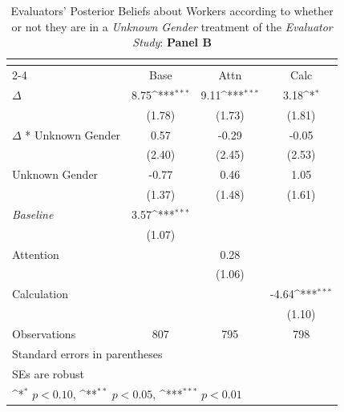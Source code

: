 \begin{table}[htbp]\centering
\def\sym#1{\ifmmode^{#1}\else\(^{#1}\)\fi}
\caption{Evaluators' Posterior Beliefs about Workers according to whether or not they are in a \textit{Unknown Gender} treatment of the \textit{Evaluator Study}: \textbf{Panel B}}
\begin{tabular}{l*{3}{c}}
\hline\hline
                &\multicolumn{3}{c}{}                                    \\\cmidrule(lr){2-4}
                &\multicolumn{1}{c}{Base}&\multicolumn{1}{c}{Attn}&\multicolumn{1}{c}{Calc}\\
\hline
$\Delta$        &     8.75\sym{***}&     9.11\sym{***}&     3.18\sym{*}  \\
                &   (1.78)         &   (1.73)         &   (1.81)         \\
$\Delta$ * Unknown Gender&     0.57         &    -0.29         &    -0.05         \\
                &   (2.40)         &   (2.45)         &   (2.53)         \\
Unknown Gender  &    -0.77         &     0.46         &     1.05         \\
                &   (1.37)         &   (1.48)         &   (1.61)         \\
\textit{Baseline}&     3.57\sym{***}&                  &                  \\
                &   (1.07)         &                  &                  \\
Attention       &                  &     0.28         &                  \\
                &                  &   (1.06)         &                  \\
Calculation     &                  &                  &    -4.64\sym{***}\\
                &                  &                  &   (1.10)         \\
\hline
Observations    &      807         &      795         &      798         \\
\hline\hline
\multicolumn{4}{l}{\footnotesize Standard errors in parentheses}\\
\multicolumn{4}{l}{\footnotesize SEs are robust}\\
\multicolumn{4}{l}{\footnotesize \sym{*} \(p<0.10\), \sym{**} \(p<0.05\), \sym{***} \(p<0.01\)}\\
\end{tabular}
\end{table}

